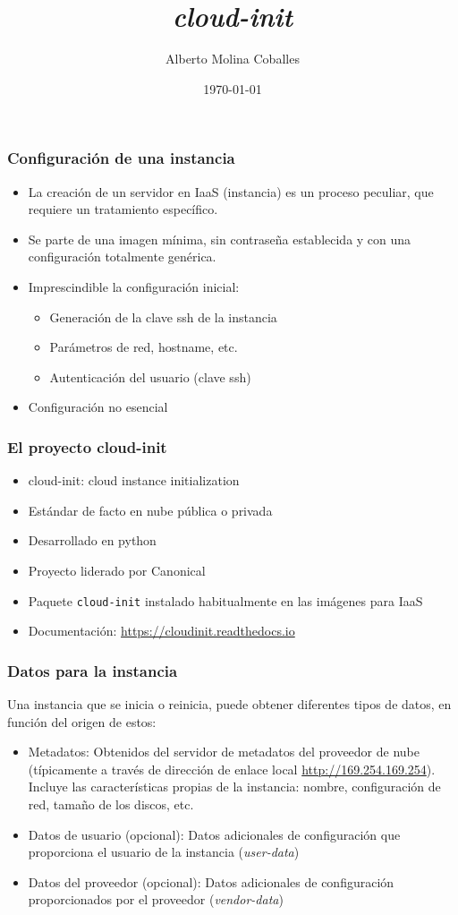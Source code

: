 \documentclass{beamer}
\author{Alberto Molina Coballes}
\title{\emph{cloud-init}}
\institute{IES Gonzalo Nazareno}
\date{\today}
\begin{document}
\def\braces#1{[#1]}

\begin{frame}[t,plain]
\titlepage
\end{frame}

\begin{frame}
  \frametitle{Configuración de una instancia}
  \begin{itemize}
  \item La creación de un servidor en IaaS (instancia) es un proceso
    peculiar, que requiere un tratamiento específico.
  \item Se parte de una imagen mínima, sin contraseña establecida y
    con una configuración totalmente genérica.
  \item Imprescindible la configuración inicial:
    \begin{itemize}
    \item Generación de la clave ssh de la instancia
    \item Parámetros de red, hostname, etc.
    \item Autenticación del usuario (clave ssh)
    \end{itemize}
  \item Configuración no esencial
  \end{itemize}
\end{frame}

\begin{frame}
  \frametitle{El proyecto cloud-init}
  \begin{itemize}
  \item cloud-init: cloud instance initialization
  \item Estándar de facto en nube pública o privada
  \item Desarrollado en python
  \item Proyecto liderado por Canonical
  \item Paquete \texttt{cloud-init} instalado habitualmente en las
    imágenes para IaaS
  \item Documentación: \url{https://cloudinit.readthedocs.io}
  \end{itemize}
\end{frame}

\begin{frame}
  \frametitle{Datos para la instancia}
  Una instancia que se inicia o reinicia, puede obtener diferentes tipos de datos, en función del origen de estos:
  \begin{itemize}
  \item Metadatos: Obtenidos del servidor de metadatos del proveedor de nube (típicamente a través de dirección de enlace local \url{http://169.254.169.254}). Incluye las características propias de la instancia: nombre, configuración de red, tamaño de los discos, etc.
  \item Datos de usuario (opcional): Datos adicionales de configuración que proporciona el usuario de la instancia (\textit{user-data})
  \item Datos del proveedor (opcional): Datos adicionales de configuración proporcionados por el proveedor (\textit{vendor-data})
  \end{itemize}
\end{frame}
\end{document}
